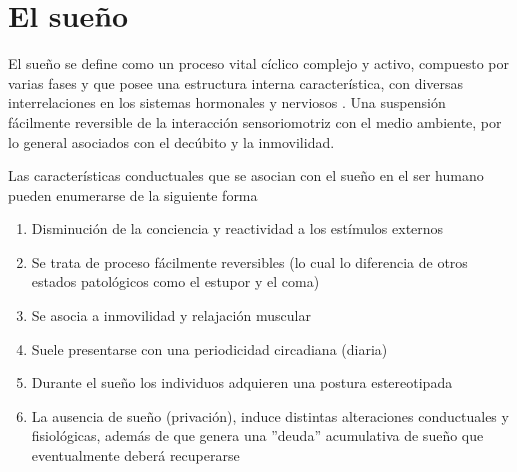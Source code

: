 

\section{El sue\~no}


El sue\~no se define como un proceso vital c\'iclico complejo y activo, compuesto por varias 
fases y que posee una estructura interna caracter\'istica, con diversas interrelaciones en los 
sistemas hormonales y nerviosos \cite{FernandezConde07}. Una suspensi\'on f\'acilmente reversible 
de la interacci\'on sensoriomotriz con el medio ambiente, por lo general asociados con el 
dec\'ubito y la inmovilidad.


Las caracter\'isticas conductuales que se asocian con el sue\~no en el ser humano pueden 
enumerarse de la siguiente forma\cite{CarrilloMora} 
\begin{enumerate}
\item Disminuci\'on de la conciencia y reactividad a los est\'imulos externos
\item Se trata de proceso f\'acilmente reversibles (lo cual lo diferencia de otros estados 
patol\'ogicos como el estupor y el coma)
\item Se asocia a inmovilidad y relajaci\'on muscular
\item Suele presentarse con una periodicidad circadiana (diaria)
\item Durante el sue\~no los individuos adquieren una postura estereotipada
\item La ausencia de sue\~no (privaci\'on), induce distintas alteraciones conductuales y 
fisiol\'ogicas, adem\'as de que genera una ''deuda'' acumulativa de sueño que eventualmente 
deber\'a recuperarse 
\end{enumerate}

